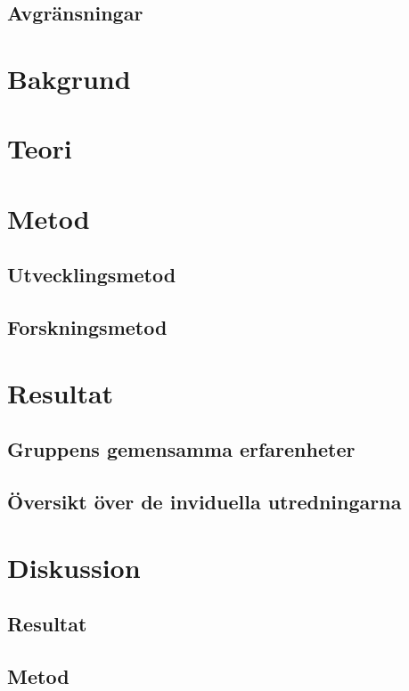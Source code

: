 \documentclass{article}
\begin{document}
\subsection{Avgränsningar}

\section{Bakgrund}

\section{Teori}

\section{Metod}

\subsection{Utvecklingsmetod}

\subsection{Forskningsmetod}

\section{Resultat}

\subsection{Gruppens gemensamma erfarenheter}

\subsection{Översikt över de inviduella utredningarna}

\section{Diskussion}

\subsection{Resultat}

\subsection{Metod}
\end{document}
